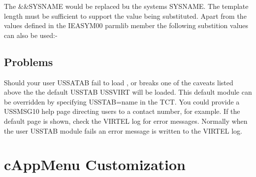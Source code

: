 \documentclass[letterpaper,10pt,english]{sphinxmanual}
\begin{document}
The \&\&SYSNAME would be replaced bu the systems SYSNAME. The template length must be sufficient to support the value being substituted. Apart from the values defined in the IEASYM00 parmlib member the following substition values can also be used:-

\begin{sphinxVerbatim}[commandchars=\\\{\}]
     
                           
                                  
                                  
                                
                                
\end{sphinxVerbatim}


\section{Problems}
\label{\detokenize{Customization:problems}}
Should your user USSATAB fail to load , or breaks one of the caveats listed above the the default USSTAB USSVIRT will be loaded. This default module can be overridden by specifying USSTAB=name in the TCT. You could provide a USSMSG10 help page directing users to a contact number, for example. If the default page is shown, check the VIRTEL log for error messages. Normally when the user USSTAB module fails an error message is written to the VIRTEL log.

\ignorespaces 

\chapter{cAppMenu Customization}
\label{\detokenize{Customization:cappmenu-customization}}\label{\detokenize{Customization:index-124}}
\end{document}

